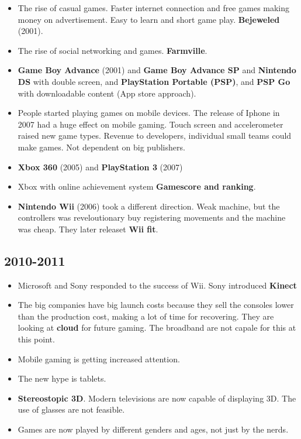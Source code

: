 \begin{itemize}
      \item The rise of casual games. Faster internet connection and free games making money on advertisement. Easy to learn and short game play. {\bf Bejeweled} (2001).
      \item The rise of social networking and games. {\bf Farmville}. 
      \item {\bf Game Boy Advance} (2001) and {\bf Game Boy Advance SP} and {\bf Nintendo DS} with double screen, and {\bf PlayStation Portable (PSP)}, and {\bf PSP Go} with downloadable content (App store approach).
      \item People started playing games on mobile devices. The release of Iphone in 2007 had a huge effect on mobile gaming. Touch screen and accelerometer raised new game types. Revenue to developers, individual small teams could make games. Not dependent on big publishers. 
      \item {\bf Xbox 360} (2005) and {\bf PlayStation 3} (2007)
      \item Xbox with online achievement system {\bf Gamescore and ranking}.
      \item {\bf Nintendo Wii} (2006) took a different direction. Weak machine, but the controllers was reveloutionary buy registering movements and the machine was cheap. They later releaset {\bf Wii fit}. 
    \end{itemize}

  \subsection{2010-2011}
    \begin{itemize}
      \item Microsoft and Sony responded to the success of Wii. Sony introduced {\bf Kinect}
      \item The big companies have big launch costs because they sell the consoles lower than the production cost, making a lot of time for recovering. They are looking at {\bf cloud} for future gaming. The broadband are not capale for this at this point. 
      \item Mobile gaming is getting increased attention. 
      \item The new hype is tablets. 
      \item {\bf Stereostopic 3D}. Modern televisions are now capable of displaying 3D. The use of glasses are not feasible. 
      \item Games are now played by different genders and ages, not just by the nerds. 
    \end{itemize}

